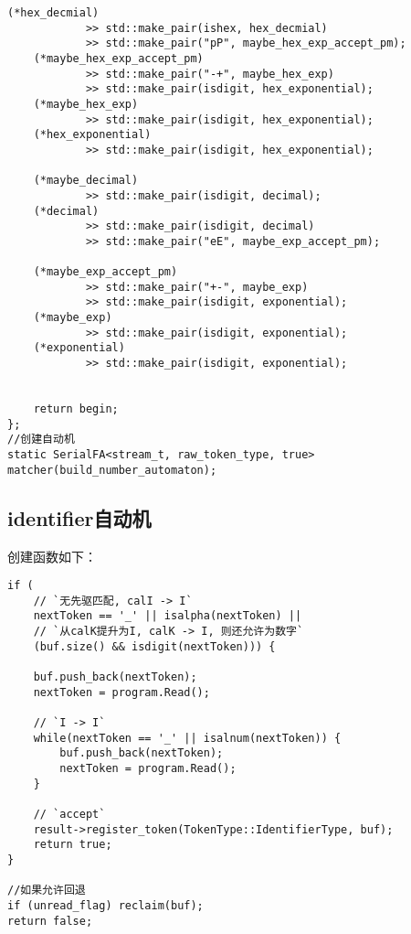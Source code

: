 \documentclass[UTF8]{ctexart}
\begin{document}
{\begin{lstlisting}[language={[ANSI]C++}]
    (*hex_decmial)
            >> std::make_pair(ishex, hex_decmial)
            >> std::make_pair("pP", maybe_hex_exp_accept_pm);
    (*maybe_hex_exp_accept_pm)
            >> std::make_pair("-+", maybe_hex_exp)
            >> std::make_pair(isdigit, hex_exponential);
    (*maybe_hex_exp)
            >> std::make_pair(isdigit, hex_exponential);
    (*hex_exponential)
            >> std::make_pair(isdigit, hex_exponential);

    (*maybe_decimal)
            >> std::make_pair(isdigit, decimal);
    (*decimal)
            >> std::make_pair(isdigit, decimal)
            >> std::make_pair("eE", maybe_exp_accept_pm);
    
    (*maybe_exp_accept_pm)
            >> std::make_pair("+-", maybe_exp)
            >> std::make_pair(isdigit, exponential);
    (*maybe_exp)
            >> std::make_pair(isdigit, exponential);
    (*exponential)
            >> std::make_pair(isdigit, exponential);
    

    return begin;
};
//创建自动机
static SerialFA<stream_t, raw_token_type, true> matcher(build_number_automaton);
\end{lstlisting}
}
\subsection{identifier自动机}
\begin{figure}[!h]
    \centering
\end{figure}
\par 创建函数如下：
{\firacode
\begin{lstlisting}[language={[ANSI]C++}]
if (
    // `无先驱匹配, calI -> I`
    nextToken == '_' || isalpha(nextToken) ||
    // `从calK提升为I, calK -> I, 则还允许为数字`
    (buf.size() && isdigit(nextToken))) {
    
    buf.push_back(nextToken);
    nextToken = program.Read();

    // `I -> I`
    while(nextToken == '_' || isalnum(nextToken)) {
        buf.push_back(nextToken);
        nextToken = program.Read();
    }

    // `accept`
    result->register_token(TokenType::IdentifierType, buf);
    return true;
}

//如果允许回退
if (unread_flag) reclaim(buf);
return false;
\end{lstlisting}
}
\newpage
\end{document}
